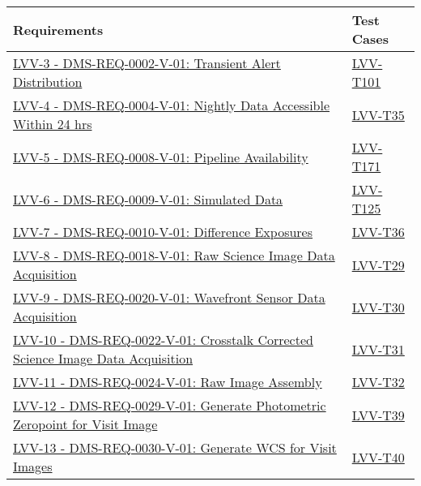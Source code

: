 \begin{longtable}[]{p{13cm}p{3cm}}
\toprule
Requirements & Test Cases\tabularnewline
\midrule
\endhead
\href{https://jira.lsstcorp.org/browse/LVV-3}{LVV-3 - DMS-REQ-0002-V-01:
Transient Alert Distribution} &
\protect\hyperlink{lvv-t101---verify-implementation-of-transient-alert-distribution-dms-req-0002}{LVV-T101}\tabularnewline
\href{https://jira.lsstcorp.org/browse/LVV-4}{LVV-4 - DMS-REQ-0004-V-01:
Nightly Data Accessible Within 24 hrs} &
\protect\hyperlink{lvv-t35---verify-implementation-of-nightly-data-accessible-within-24-hrs-dms-req-0004}{LVV-T35}\tabularnewline
\href{https://jira.lsstcorp.org/browse/LVV-5}{LVV-5 - DMS-REQ-0008-V-01:
Pipeline Availability} &
\protect\hyperlink{lvv-t171---verify-implementation-of-pipeline-availability-dms-req-0008}{LVV-T171}\tabularnewline
\href{https://jira.lsstcorp.org/browse/LVV-6}{LVV-6 - DMS-REQ-0009-V-01:
Simulated Data} &
\protect\hyperlink{lvv-t125---verify-implementatino-of--simulated-data-dms-req-0009}{LVV-T125}\tabularnewline
\href{https://jira.lsstcorp.org/browse/LVV-7}{LVV-7 - DMS-REQ-0010-V-01:
Difference Exposures} &
\protect\hyperlink{lvv-t36---verify-implementation-of-difference-exposures--dms-req-0010}{LVV-T36}\tabularnewline
\href{https://jira.lsstcorp.org/browse/LVV-8}{LVV-8 - DMS-REQ-0018-V-01:
Raw Science Image Data Acquisition} &
\protect\hyperlink{lvv-t29---verify-implementation-of-raw-science-image-data-acquisition-dms-req-0018}{LVV-T29}\tabularnewline
\href{https://jira.lsstcorp.org/browse/LVV-9}{LVV-9 - DMS-REQ-0020-V-01:
Wavefront Sensor Data Acquisition} &
\protect\hyperlink{lvv-t30---verify-implementation-of-wavefront-sensor-data-acquisition-dms-req-0020}{LVV-T30}\tabularnewline
\href{https://jira.lsstcorp.org/browse/LVV-10}{LVV-10 -
DMS-REQ-0022-V-01: Crosstalk Corrected Science Image Data Acquisition} &
\protect\hyperlink{lvv-t31---verify-implementation-of-crosstalk-corrected-science-image-data-acquisition-dms-req-0022}{LVV-T31}\tabularnewline
\href{https://jira.lsstcorp.org/browse/LVV-11}{LVV-11 -
DMS-REQ-0024-V-01: Raw Image Assembly} &
\protect\hyperlink{lvv-t32---verify-implementation-of-raw-image-assembly-dms-req-0024}{LVV-T32}\tabularnewline
\href{https://jira.lsstcorp.org/browse/LVV-12}{LVV-12 -
DMS-REQ-0029-V-01: Generate Photometric Zeropoint for Visit Image} &
\protect\hyperlink{lvv-t39---verify-implementation-of-generate-photometric-zeropoint-for-visit-image-dms-req-0029}{LVV-T39}\tabularnewline
\href{https://jira.lsstcorp.org/browse/LVV-13}{LVV-13 -
DMS-REQ-0030-V-01: Generate WCS for Visit Images} &
\protect\hyperlink{lvv-t40---verify-implementation-of-generate-wcs-for-visit-images-dms-req-0030}{LVV-T40}\tabularnewline

\end{longtable}
